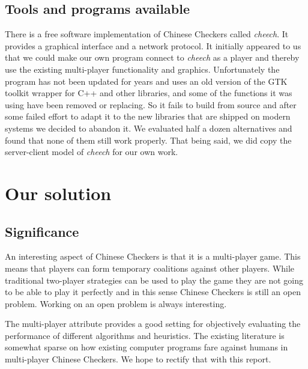 \documentclass[a4paper,11pt]{article}
\begin{document}
\subsection{Tools and programs available}
There is a free software implementation of Chinese Checkers called
\emph{cheech}. It provides a graphical interface and a network
protocol. It initially appeared to us that we could make our own
program connect to \emph{cheech} as a player and thereby use the
existing multi-player functionality and graphics. Unfortunately the program has
not been updated for years and uses an old version of the GTK toolkit wrapper
for C++ and other libraries, and some of the functions it was using have been
removed or replacing. So it fails to build from source and after some failed
effort to adapt it to the new libraries that are shipped on modern systems we
decided to abandon it.
We evaluated half a dozen alternatives and found that none of them
still work properly. That being said, we did copy the server-client
model of \emph{cheech} for our own work.

\section{Our solution}
\subsection{Significance}

An interesting aspect of Chinese Checkers is that it is a multi-player
game. This means that players can form temporary coalitions against
other players. While traditional two-player strategies can be used to
play the game they are not going to be able to play it perfectly and
in this sense Chinese Checkers is still an open problem. Working on an
open problem is always interesting.

The multi-player attribute provides a good setting for objectively
evaluating the performance of different algorithms and heuristics. The
existing literature is somewhat sparse on how existing computer
programs fare against humans in multi-player Chinese Checkers. We hope
to rectify that with this report.
\end{document}
